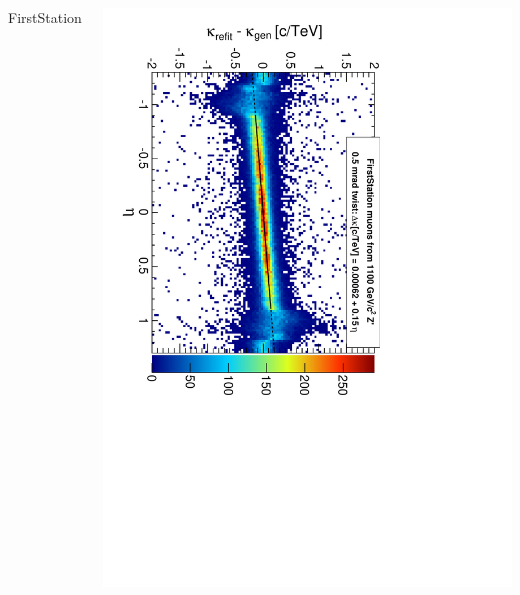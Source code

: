 \documentclass[compress]{beamer}
\begin{document}
\begin{frame}
\begin{columns}
\begin{center}
FirstStation

\vspace{-0.2 cm}
\end{center}
\includegraphics[height=\linewidth, angle=90]{curvbias_vseta_twist0_5mrad_1100_TeVMuons2firstHit.pdf}
\end{columns}
\end{frame}
\end{document}
